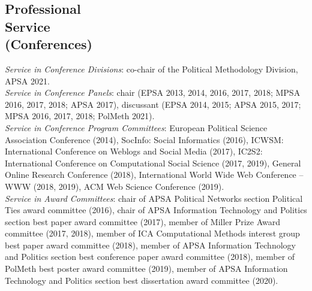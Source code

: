 \documentclass[margin,line,11pt]{resume}
\newcommand{\nl}{\vspace{0.10in}\\}
\begin{document}
\begin{resume}


\section{\mysidestyle Professional\\Service\\(Conferences)}

\emph{Service in Conference Divisions}: co-chair of the Political Methodology Division, APSA 2021.\nl
\emph{Service in Conference Panels}: chair (EPSA 2013, 2014, 2016, 2017, 2018; MPSA 2016, 2017, 2018; APSA 2017), discussant (EPSA 2014, 2015; APSA 2015, 2017; MPSA 2016, 2017, 2018; PolMeth 2021).\nl
\emph{Service in Conference Program Committees}: European Political Science Association Conference (2014), SocInfo: Social Informatics (2016), ICWSM: International Conference on Weblogs and Social Media (2017), IC2S2: International Conference on Computational Social Science (2017, 2019), General Online Research Conference (2018),  International World Wide Web Conference -- WWW (2018, 2019), ACM Web Science Conference (2019).\nl
\emph{Service in Award Committees}: chair of APSA Political Networks section Political Ties award committee (2016), chair of APSA Information Technology and Politics section best paper award committee (2017), member of Miller Prize Award committee (2017, 2018), member of ICA Computational Methods interest group best paper award committee (2018), member of APSA Information Technology and Politics section best conference paper award committee (2018), member of PolMeth best poster award committee (2019), member of APSA Information Technology and Politics section best dissertation award committee (2020).


\end{resume}
\end{document}
